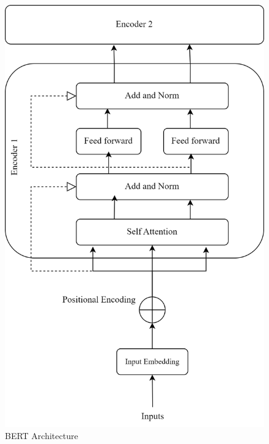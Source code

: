 \begin{figure}[H]
\centering
\includegraphics [scale=1.4]{img/Graphics/_Bert architecture.png}
\caption[ BERT Architecturee]{ BERT Architecture}

\end{figure}


